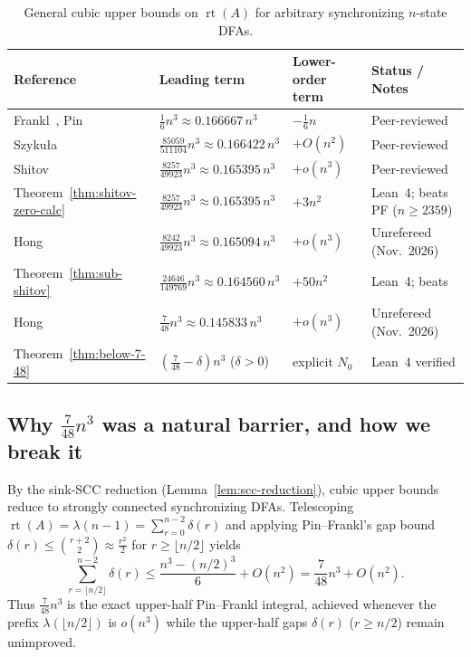 \documentclass[11pt]{article}
\theoremstyle{definition}
\theoremstyle{remark}
\newcommand{\rt}{\operatorname{rt}}
\begin{document}
\begin{table}[ht]
\centering
\caption{General cubic upper bounds on $\rt(A)$ for arbitrary synchronizing $n$-state DFAs.}
\label{tab:comparison}
\small
\begin{tabular}{@{}llll@{}}
\toprule
Reference & Leading term & Lower-order term & Status / Notes \\
\midrule
Frankl~\cite{Frankl1982}, Pin~\cite{Pin1983} & $\frac{1}{6} n^3 \approx 0.166667\, n^3$ & $-\frac{1}{6} n$ & Peer-reviewed \\
Szyku\l a~\cite{Szykula2018} & $\frac{85059}{511104} n^3 \approx 0.166422\, n^3$ & $+O(n^2)$ & Peer-reviewed \\
Shitov~\cite{Shitov2019} & $\frac{8257}{49923} n^3 \approx 0.165395\, n^3$ & $+o(n^3)$ & Peer-reviewed \\
Theorem~\ref{thm:shitov-zero-calc} & $\frac{8257}{49923} n^3 \approx 0.165395\, n^3$ & $+3 n^2$ & Lean~4; beats PF ($n \ge 2359$) \\
Hong~\cite{Hong2026a} & $\frac{8242}{49923} n^3 \approx 0.165094\, n^3$ & $+o(n^3)$ & Unrefereed (Nov.~2026) \\
Theorem~\ref{thm:sub-shitov} & $\frac{24646}{149769} n^3 \approx 0.164560\, n^3$ & $+50 n^2$ & Lean~4; beats \cite{Shitov2019,Hong2026a} \\
Hong~\cite{Hong2026b} & $\frac{7}{48} n^3 \approx 0.145833\, n^3$ & $+o(n^3)$ & Unrefereed (Nov.~2026) \\
Theorem~\ref{thm:below-7-48} & $(\frac{7}{48} - \delta) n^3$ ($\delta > 0$) & explicit $N_0$ & Lean~4 verified \\
\bottomrule
\end{tabular}
\end{table}

\subsection{Why \texorpdfstring{$\frac{7}{48} n^3$}{7/48 n\textasciicircum 3} was a natural barrier, and how we break it}

By the sink-SCC reduction (Lemma~\ref{lem:scc-reduction}), cubic upper bounds reduce to strongly connected synchronizing DFAs. Telescoping $\rt(A) = \lambda(n-1) = \sum_{r=0}^{n-2} \delta(r)$ and applying Pin--Frankl's gap bound $\delta(r) \le \binom{r+2}{2} \approx \frac{r^2}{2}$ for $r \ge \lfloor n/2 \rfloor$ yields
\[
  \sum_{r = \lfloor n/2 \rfloor}^{n-2} \delta(r) \le \frac{n^3 - (n/2)^3}{6} + O(n^2) = \frac{7}{48} n^3 + O(n^2).
\]
Thus $\frac{7}{48} n^3$ is the exact upper-half Pin--Frankl integral, achieved whenever the prefix $\lambda(\lfloor n/2 \rfloor)$ is $o(n^3)$ while the upper-half gaps $\delta(r)$ ($r \ge n/2$) remain unimproved.
\end{document}
